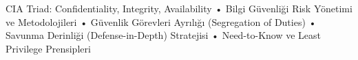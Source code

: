  CIA Triad: Confidentiality, Integrity, Availability
• Bilgi Güvenliği Risk Yönetimi ve Metodolojileri
• Güvenlik Görevleri Ayrılığı (Segregation of Duties)
• Savunma Derinliği (Defense-in-Depth) Stratejisi
• Need-to-Know ve Least Privilege Prensipleri
